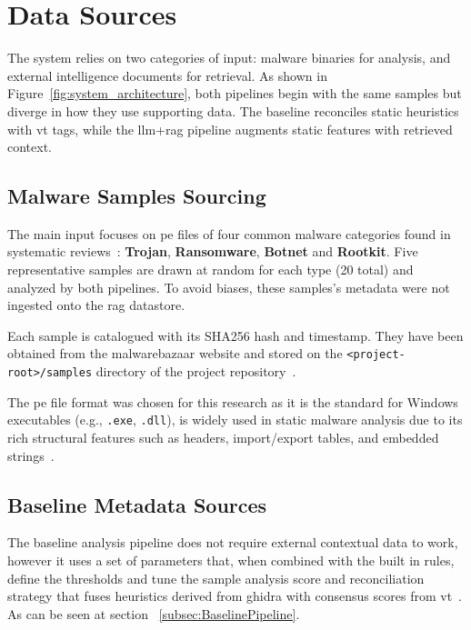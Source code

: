 \section{Data Sources}\label{sec:DataSources}
The system relies on two categories of input: malware binaries for analysis, and external
intelligence documents for retrieval. As shown in Figure~\ref{fig:system_architecture}, both
pipelines begin with the same samples but diverge in how they use supporting data. The baseline
reconciles static heuristics with \gls{vt} tags, while the \gls{llm}+\gls{rag} pipeline augments
static features with retrieved context.

\subsection{Malware Samples Sourcing}\label{subsec:MalwareSamplesSourcing}
The main input focuses on \gls{pe} files of four common malware categories found in systematic
reviews~\cite{berrios2025malware,abrazak2016rise,mat2021systematic}: \textbf{Trojan},
\textbf{Ransomware}, \textbf{Botnet} and \textbf{Rootkit}. Five representative samples are drawn at
random for each type (20 total) and analyzed by both pipelines. To avoid biases, these samples's
metadata were not ingested onto the \gls{rag} datastore.

Each sample is catalogued with its SHA256 hash and timestamp. They have been obtained from the
\gls{malwarebazaar} website and stored on the \texttt{<project-root>/samples} directory of the
project repository~\cite{rexisRepo}.

The \gls{pe} file format was chosen for this research as it is the standard for Windows executables
(e.g., \texttt{.exe}, \texttt{.dll}), is widely used in static \gls{malware} analysis due to its
rich structural features such as headers, import/export tables, and embedded
strings~\cite{fedak2020fundamentals}.

\subsection{Baseline Metadata Sources}\label{subsec:BaselineSources}
The baseline analysis pipeline does not require external contextual data to work, however it uses a
set of parameters that, when combined with the built in rules, define the thresholds and tune the
sample analysis score and reconciliation strategy that fuses heuristics derived from \gls{ghidra}
with consensus scores from \gls{vt}~\cite{rexisReconciliationGuide}. As can be seen at section
~\ref{subsec:BaselinePipeline}.

